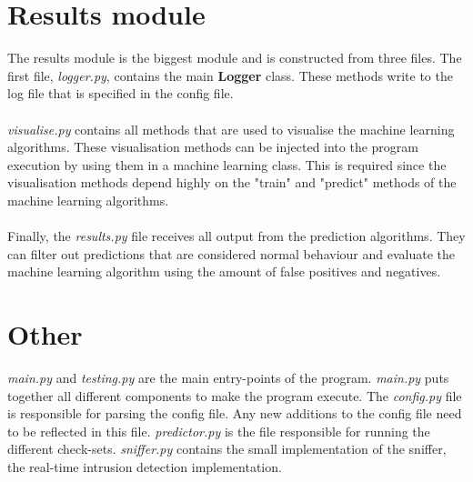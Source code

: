 \section{Results module}
The results module is the biggest module and is constructed from three files. The first file, \textit{logger.py}, contains the main \textbf{Logger} class. These methods write to the log file that is specified in the config file. \\
\\
\textit{visualise.py} contains all methods that are used to visualise the machine learning algorithms. These visualisation methods can be injected into the program execution by using them in a machine learning class. This is required since the visualisation methods depend highly on the "train" and "predict" methods of the machine learning algorithms. \\
\\
Finally, the \textit{results.py} file receives all output from the prediction algorithms. They can filter out predictions that are considered normal behaviour and evaluate the machine learning algorithm using the amount of false positives and negatives. 

\section{Other}
\textit{main.py} and \textit{testing.py} are the main entry-points of the program. \textit{main.py} puts together all different components to make the program execute. The \textit{config.py} file is responsible for parsing the config file. Any new additions to the config file need to be reflected in this file. \textit{predictor.py} is the file responsible for running the different check-sets. \textit{sniffer.py} contains the small implementation of the sniffer, the real-time intrusion detection implementation. 
